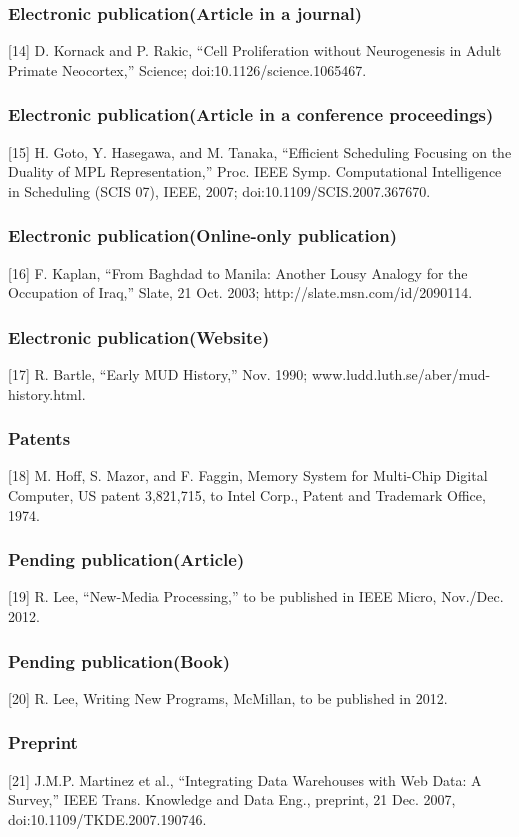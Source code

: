 \documentclass[11pt, onecolumn, twoside, a4paper]{article}
\begin{document}
\subsubsection{Electronic publication(Article in a journal)}
[14] D. Kornack and P. Rakic, ``Cell Proliferation without Neurogenesis in Adult Primate Neocortex,'' Science; doi:10.1126/science.1065467.
\subsubsection{Electronic publication(Article in a conference proceedings)}
[15] H. Goto, Y. Hasegawa, and M. Tanaka, ``Efficient Scheduling Focusing on the Duality of MPL Representation,'' Proc. IEEE Symp. Computational Intelligence in Scheduling (SCIS 07), IEEE, 2007; doi:10.1109/SCIS.2007.367670.
\subsubsection{Electronic publication(Online-only publication)}
[16] F. Kaplan, ``From Baghdad to Manila: Another Lousy Analogy for the Occupation of Iraq,'' Slate, 21 Oct. 2003; http://slate.msn.com/id/2090114.
\subsubsection{Electronic publication(Website)}
[17] R. Bartle, ``Early MUD History,'' Nov. 1990; www.ludd.luth.se/aber/mud-history.html.
\subsubsection{Patents}
[18] M. Hoff, S. Mazor, and F. Faggin, Memory System for Multi-Chip Digital Computer, US patent 3,821,715, to Intel Corp., Patent and Trademark Office, 1974.
\subsubsection{Pending publication(Article)}
[19] R. Lee, ``New-Media Processing,'' to be published in IEEE Micro, Nov./Dec. 2012.
\subsubsection{Pending publication(Book)}
[20] R. Lee, Writing New Programs, McMillan, to be published in 2012.
\subsubsection{Preprint}
[21] J.M.P. Martinez et al., ``Integrating Data Warehouses with Web Data: A Survey,'' IEEE Trans. Knowledge and Data Eng., preprint, 21 Dec. 2007, doi:10.1109/TKDE.2007.190746.
\end{document}
